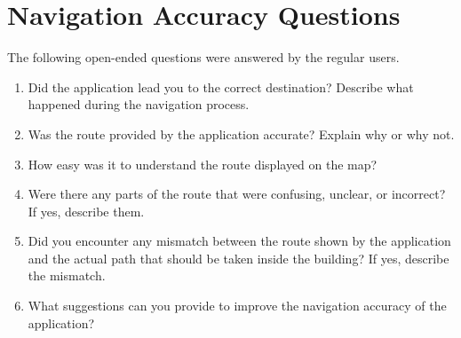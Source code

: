 \chapter[NAVIGATION ACCURACY QUESTIONS]{Navigation Accuracy Questions}\label{app:B}

The following open-ended questions were answered by the regular users.

\begin{enumerate}
\def\labelenumi{\arabic{enumi}.}
\item
  Did the application lead you to the correct destination? Describe what
  happened during the navigation process.
\item
  Was the route provided by the application accurate? Explain why or why not.
\item
  How easy was it to understand the route displayed on the map?
\item
  Were there any parts of the route that were confusing, unclear, or incorrect?
  If yes, describe them.
\item
  Did you encounter any mismatch between the route shown by the application and
  the actual path that should be taken inside the building? If yes, describe the
  mismatch.
\item
  What suggestions can you provide to improve the navigation accuracy of the
  application?
\end{enumerate}
